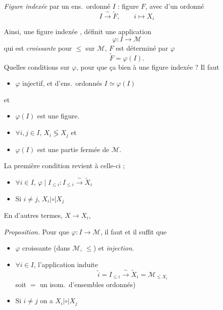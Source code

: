 \documentclass[11pt,a4paper]{article}
\begin{document}
\emph{Figure indexée} par un ens.\ ordonné $I$ : figure $F$, avec 
d'un ordonné
\[
  I \xrightarrow{\ \sim\ } \widetilde{F}, \qquad i \longmapsto X_{i}
\]

Ainsi, une figure indexée , définit une application
\[
  \varphi : I \longrightarrow \mathcal{M}
\]
qui est \emph{croissante} pour $\leq$ sur $\mathcal{M}$, 
$F$ est déterminé par $\varphi$ \struck{\ill{}} 
\[
  \widetilde{F} = \varphi(I) .
\]
Quelles conditions sur $\varphi$, pour que ça  bien à une
figure indexée ? Il faut
\begin{itemize}
  \item[a)] $\varphi$ injectif, et   
    d'ens.\ ordonnés $I \simeq \varphi(I)$
\end{itemize}
et
\begin{itemize}
  \item[b)] $\varphi(I)$ est une figure.  
\end{itemize}
\begin{itemize}
  \item[1°)] $\forall i, j \in I$, $X_{i} \lessgtr X_{j}$  et
  \item[2°)] $\varphi(I)$ est une partie fermée de $\mathcal{M}$.
\end{itemize}
La première condition revient à celle-ci ; 
\begin{itemize}
  \item[b)] $\forall i \in I$, $\varphi \mid I_{\leq i} : I_{\leq i}
    \xrightarrow{\ \sim\ } \widetilde{X}_{i}$
  \item[c)] Si $i \neq j$, $X_{i} \mathrel{|\circ|} X_{j}$
\end{itemize}

En d'autres termes,   $X \to X_{i}$,

\emph{Proposition.} Pour que $\varphi : I \to \mathcal{M}$,  il faut et il suffit que
\begin{itemize}
  \item[a)] $\varphi$  croissante (dans $\mathcal{M}$, $\leq$) et
    \emph{injection}.
  \item[b)] $\forall i \in I$, l'application induite
    \[
      \widetilde{i} = I_{\leq i} \xrightarrow{\ \sim\ } \widetilde{X}_{i} =
      \mathcal{M}_{\leq X_{i}}
    \]
    soit   \struck{(\ill{} \ill{})}
     $=$ un isom.\ d'ensembles ordonnés)
  \item[c)] Si $i \neq j$  on a $X_{i} \mathrel{|\circ|} X_{j}$
\end{itemize}
\end{document}
